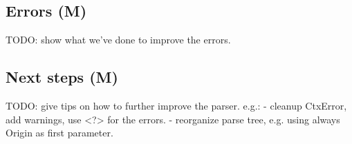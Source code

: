 \subsection{Errors (M)}
\label{subsec:design-errors}
TODO: show what we've done to improve the errors.

\subsection{Next steps (M)}
\label{subsec:design-next-steps}
TODO: give tips on how to further improve the parser. e.g.:
  - cleanup CtxError, add warnings, use <?> for the errors.
  - reorganize parse tree, e.g. using always Origin as first parameter.